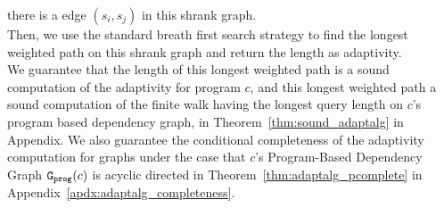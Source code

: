     there is a edge $(s_i, s_j)$ in this shrank graph. \\ 
    Then, we use the standard breath first search strategy to find the longest weighted path
    on this shrank graph and return the length as adaptivity.
    \\
    We guarantee that 
    the length of this longest weighted path is a sound computation of the adaptivity for program $c$,
    and this longest weighted path a sound computation of the finite walk having the longest query length 
    on $c$'s program based dependency graph, in Theorem~\ref{thm:sound_adaptalg}
    in Appendix.
%    
We also guarantee the conditional completeness of the adaptivity computation for graphs under the case that 
$c$'s Program-Based Dependency Graph $\mathtt{{G_{prog}}}(c)$ is acyclic directed
in Theorem~\ref{thm:adaptalg_pcomplete} 
in Appendix~\ref{apdx:adaptalg_completeness}.
